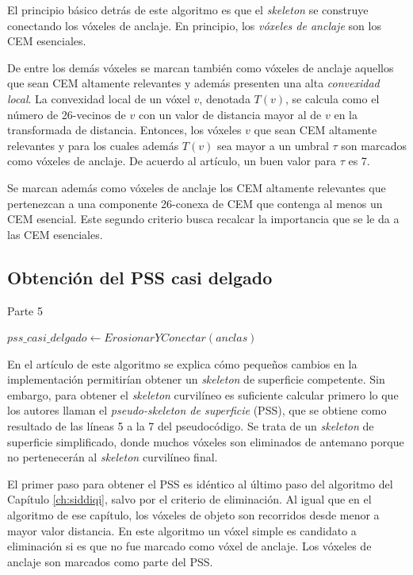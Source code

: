 El principio básico detrás de este algoritmo es que el \textit{skeleton} se construye conectando los vóxeles de anclaje. En principio, los \textit{vóxeles de anclaje} son los CEM esenciales.

De entre los demás vóxeles se marcan también como vóxeles de anclaje aquellos que sean CEM altamente relevantes y además presenten una alta \textit{convexidad local}. La convexidad local de un vóxel $v$, denotada $T(v)$, se calcula como el número de 26-vecinos de $v$ con un valor de distancia mayor al de $v$ en la transformada de distancia. Entonces, los vóxeles $v$ que sean CEM altamente relevantes y para los cuales además $T(v)$ sea mayor a un umbral $\tau$ son marcados como vóxeles de anclaje. De acuerdo al artículo, un buen valor para $\tau$ es 7.

Se marcan además como vóxeles de anclaje los CEM altamente relevantes que pertenezcan a una componente 26-conexa de CEM que contenga al menos un CEM esencial. Este segundo criterio busca recalcar la importancia que se le da a las CEM esenciales.

\subsection{Obtención del PSS casi delgado}

\begin{algorithm}[H]
\caption{Parte 5}
\begin{algorithmic}[1]
\State $pss\_casi\_delgado \gets ErosionarYConectar(anclas)$
\end{algorithmic}
\end{algorithm}

En el artículo de este algoritmo se explica cómo pequeños cambios en la implementación permitirían obtener un \textit{skeleton} de superficie competente. Sin embargo, para obtener el \textit{skeleton} curvilíneo es suficiente calcular primero lo que los autores llaman el \textit{pseudo-skeleton de superficie} (PSS), que se obtiene como resultado de las líneas 5 a la 7 del pseudocódigo. Se trata de un \textit{skeleton} de superficie simplificado, donde muchos vóxeles son eliminados de antemano porque no pertenecerán al \textit{skeleton} curvilíneo final.

El primer paso para obtener el PSS es idéntico al último paso del algoritmo del Capítulo \ref{ch:siddiqi}, salvo por el criterio de eliminación. Al igual que en el algoritmo de ese capítulo, los vóxeles de objeto son recorridos desde menor a mayor valor distancia. En este algoritmo un vóxel simple es candidato a eliminación si es que no fue marcado como vóxel de anclaje. Los vóxeles de anclaje son marcados como parte del PSS.

